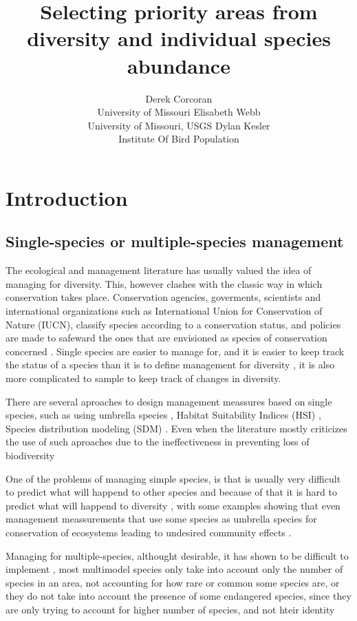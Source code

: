 \documentclass[article]{jss}
\author{
Derek Corcoran\\University of Missouri \And Elisabeth Webb\\University of Missouri, USGS \And Dylan Kesler\\Institute Of Bird Population
}
\title{Selecting priority areas from diversity and individual species abundance
\pkg{DiversityOccupancy}}
\begin{document}
\section{Introduction}\label{introduction}

\subsection{Single-species or multiple-species
management}\label{single-species-or-multiple-species-management}

The ecological and management literature has usually valued the idea of
managing for diversity. This, however clashes with the classic way in
which conservation takes place. Conservation agencies, goverments,
scientists and international organizations such as International Union
for Conservation of Nature (IUCN), classify species according to a
conservation status, and policies are made to safeward the ones that are
envisioned as species of conservation concerned
\citep{keller2004red, rodrigues2006value}. Single species are easier to
manage for, and it is easier to keep track the status of a species than
it is to define management for diversity
\citep{simberloff1998flagships}, it is also more complicated to sample
to keep track of changes in diversity.

There are several aproaches to design management meassures based on
single species, such as using umbrella species
\citep{crosby2015looking, bichet2016maintaining}, Habitat Suitability
Indices (HSI)
\citep{reza2013integrating, soniat2013predicting, zohmann2013modelling},
Species distribution modeling (SDM)
\citep{peterson2011ecological, guisan2013predicting}. Even when the
literature mostly criticizes the use of such aproaches due to the
ineffectiveness in preventing loss of biodiversity
\citep{roberge2004usefulness, branton2011assessing}

One of the problems of managing simple species, is that is usually very
difficult to predict what will happend to other species and because of
that it is hard to predict what will happend to diversity
\citep{pulliam2000relationship}, with some examples showing that even
management meassurements that use some species as umbrella species for
conservation of ecosystems leading to undesired community effects
\citep{white2013conservation}.

Managing for multiple-species, althought desirable, it has shown to be
difficult to implement
\citep{mollmann2014implementing, lmgren2015baltic}, most multimodel
species only take into account only the number of species in an area,
not accounting for how rare or common some species are, or they do not
take into account the presence of some endangered species, since they
are only trying to account for higher number of species, and not hteir
identity
\citep{taft2002waterbird, tori2002wetland, plaganyi2014multispecies}
\end{document}
